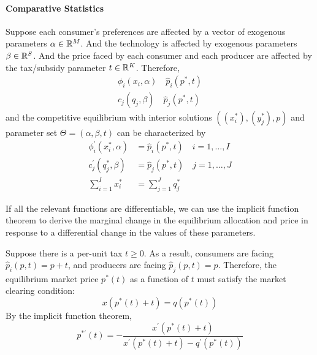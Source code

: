 \documentclass{article}
\begin{document}
	 	\paragraph{Comparative Statistics} Suppose each consumer's preferences are affected by a vector of exogenous parameters $\alpha \in \mathbb{R}^M$. And the technology is affected by exogenous parameters $\beta \in \mathbb{R}^S$. And the price faced by each consumer and each producer are affected by the tax/subsidy parameter $t \in \mathbb{R}^K$. Therefore,
	 	\begin{align}
	 		\phi_i(x_i, \alpha) \quad
	 		\hat{p}_i(p^*, t)\\
	 		c_j(q_j, \beta) \quad
	 		\hat{p}_j(p^*, t)
	 	\end{align}
	 	and the competitive equilibrium with interior solutions $((x^*_i), (y^*_j), p)$ and parameter set $\Theta = (\alpha, \beta, t)$ can be characterized by
	 	\begin{align}
	 		\phi_{i}^{\prime}\left(x_{i}^{*}, \alpha\right)&=\hat{p}_{i}\left(p^{*}, t\right) \quad i=1, \dots, I \\
	 		c_{j}^{\prime}\left(q_{j}^{*}, \beta\right)&=\hat{p}_{j}\left(p^{*}, t\right) \quad j=1, \ldots, J \\
	 		\sum_{i=1}^{I} x_{i}^{*}&=\sum_{j=1}^{J} q_{j}^{*}
	 	\end{align}
	 	
	 	\begin{remark}
	 		If all the relevant functions are differentiable, we can use the implicit function theorem to derive the marginal change in the equilibrium allocation and price in response to a differential change in the values of these parameters.
	 	\end{remark}
	 	
	 	\begin{example}
	 		Suppose there is a per-unit tax $t \geq 0$. As a result, consumers are facing $\hat{p}_i(p, t) = p + t$, and producers are facing $\hat{p}_j(p, t) = p$. Therefore, the equilibrium market price $p^*(t)$ as a function of $t$ must satisfy the market clearing condition:
	 		\begin{equation}
	 			x\left(p^{*}(t)+t\right)=q\left(p^{*}(t)\right)
	 		\end{equation}
	 		By the implicit function theorem,
	 		\begin{equation}
	 			p^{* \prime}(t)=-\frac{x^{\prime}\left(p^{*}(t)+t\right)}{x^{\prime}\left(p^{*}(t)+t\right)-q^{\prime}\left(p^{*}(t)\right)}
	 		\end{equation}
	 	\end{example}
\end{document}
